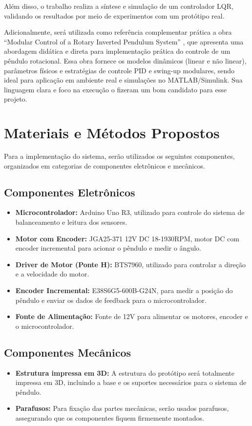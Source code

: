 \documentclass[9pt,a4paper,twocolumn,twoside]{tau-class/tau}
\begin{document}
    Além disso, o trabalho realiza a síntese e simulação de um controlador LQR, validando os resultados por meio de experimentos com um protótipo real.
    
    Adicionalmente, será utilizada como referência complementar prática a obra “Modular Control of a Rotary Inverted Pendulum System” \cite{diao2016}, que apresenta uma abordagem didática e direta para implementação prática do controle de um pêndulo rotacional. Essa obra fornece os modelos dinâmicos (linear e não linear), parâmetros físicos e estratégias de controle PID e swing-up modulares, sendo ideal para aplicação em ambiente real e simulações no MATLAB/Simulink. Sua linguagem clara e foco na execução o fizeram um bom candidato para esse projeto.


\section{Materiais e Métodos Propostos}

    Para a implementação do sistema, serão utilizados os seguintes componentes, organizados em categorias de componentes eletrônicos e mecânicos.

    \subsection{Componentes Eletrônicos}
    \begin{itemize}
        \item \textbf{Microcontrolador:} Arduino Uno R3, utilizado para controle do sistema de balanceamento e leitura dos sensores.
        \item \textbf{Motor com Encoder:} JGA25-371 12V DC 18-1930RPM, motor DC com encoder incremental para acionar o pêndulo e medir o ângulo.
        \item \textbf{Driver de Motor (Ponte H):} BTS7960, utilizado para controlar a direção e a velocidade do motor.
        \item \textbf{Encoder Incremental:} E38S6G5-600B-G24N, para medir a posição do pêndulo e enviar os dados de feedback para o microcontrolador.
        \item \textbf{Fonte de Alimentação:} Fonte de 12V para alimentar os motores, encoder e o microcontrolador.
    \end{itemize}

    \subsection{Componentes Mecânicos}
    \begin{itemize}
        \item \textbf{Estrutura impressa em 3D:} A estrutura do protótipo será totalmente impressa em 3D, incluindo a base e os suportes necessários para o sistema de pêndulo.
        \item \textbf{Parafusos:} Para fixação das partes mecânicas, serão usados parafusos, assegurando que os componentes fiquem firmemente montados.
    \end{itemize}
    
\end{document}
